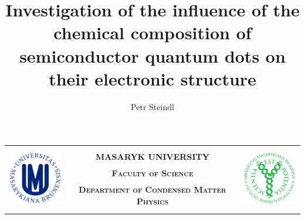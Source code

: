 \documentclass[
a4paper, %
11pt, %
onecolumn, %
openany, %
oldfontcommands,
]{memoir}
\author{Petr Steindl}
\title{Investigation of the influence of the chemical composition of semiconductor quantum dots on their electronic structure}
\begin{document}
\frontmatter
\pagestyle{empty} %
\savepagenumber %

%	
%
%	
	

\restorepagenumber %

\begingroup
\setlength{\tabcolsep}{3pt}
	\begin{center}
	\centering
	\begin{tabular}{rcl}
		\multirow{5}{*}{\includegraphics[height=2.8cm]{MUNI_logo.png}} & &
		\multirow{5}{*}{\includegraphics[height=2.8cm]{PrF_logo2.png}}\\[-0.19cm]
		& \lsstyle\bfseries\Large {MASARYK UNIVERSITY}&\\[0.33cm]
		& \lsstyle\bfseries\Large\scshape {Faculty of Science} & \\[0.25cm]
		\lsstyle\bfseries\scshape & \small\lsstyle\bfseries\scshape {Department of Condensed Matter Physics} & \lsstyle\bfseries\scshape \\ 
		& & \\ [-0.3cm] \cmidrule[2pt]{2-2}
	\end{tabular}
\end{center}
\endgroup
\end{document}
